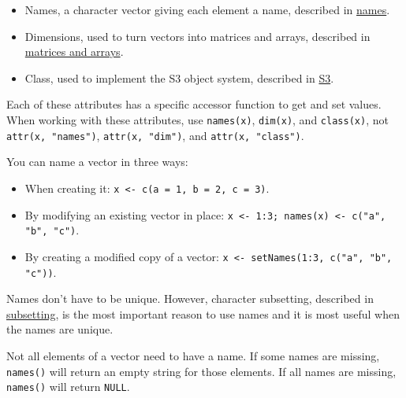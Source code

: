 \begin{itemize}
\item
  Names, a character vector giving each element a name, described in
  \hyperref[vector-names]{names}.
\item
  Dimensions, used to turn vectors into matrices and arrays, described
  in \hyperref[matrices-and-arrays]{matrices and arrays}.
\item
  Class, used to implement the S3 object system, described in
  \hyperref[s3]{S3}.
\end{itemize}

Each of these attributes has a specific accessor function to get and set
values. When working with these attributes, use \texttt{names(x)},
\texttt{dim(x)}, and \texttt{class(x)}, not \texttt{attr(x, "names")},
\texttt{attr(x, "dim")}, and \texttt{attr(x, "class")}.


You can name a vector in three ways: 

\begin{itemize}
\item
  When creating it: \texttt{x \textless{}- c(a = 1, b = 2, c = 3)}.
\item
  By modifying an existing vector in place:
  \texttt{x \textless{}- 1:3; names(x) \textless{}- c("a", "b", "c")}.
\item
  By creating a modified copy of a vector:
  \texttt{x \textless{}- setNames(1:3, c("a", "b", "c"))}.
\end{itemize}

Names don't have to be unique. However, character subsetting, described
in \hyperref[lookup-tables]{subsetting}, is the most important reason to
use names and it is most useful when the names are unique.

Not all elements of a vector need to have a name. If some names are
missing, \texttt{names()} will return an empty string for those
elements. If all names are missing, \texttt{names()} will return
\texttt{NULL}.

\begin{Shaded}
\begin{Highlighting}[]
\StringTok{ }\NormalTok{(} \NormalTok{, }\NormalTok{, }\NormalTok{)}

\StringTok{ }\NormalTok{(}\NormalTok{, }\NormalTok{, }\NormalTok{)}
\end{Highlighting}
\end{Shaded}

